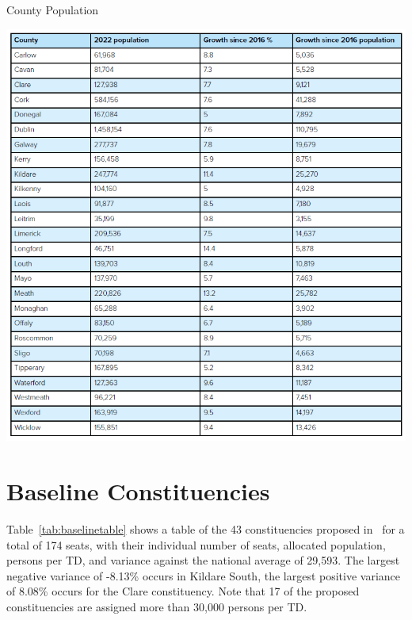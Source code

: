 \documentclass[runningheads]{llncs}
\begin{document}
\begin{table}[htbp]
\caption{\label{tab:countypop}County Population}
\includegraphics[width=\textwidth]{images/countypop}
\end{table}

\section{Baseline Constituencies}

Table~\ref{tab:baselinetable} shows a table of the 43 constituencies proposed in~\cite{ElectoralCommission2023} for a total of 174 seats, with their individual number of seats, allocated population, persons per TD, and variance against the national average of 29,593. The largest negative variance of -8.13\% occurs in Kildare South, the largest positive variance of 8.08\% occurs for the Clare constituency. Note that 17 of the proposed constituencies are assigned more than 30,000 persons per TD.
\end{document}
